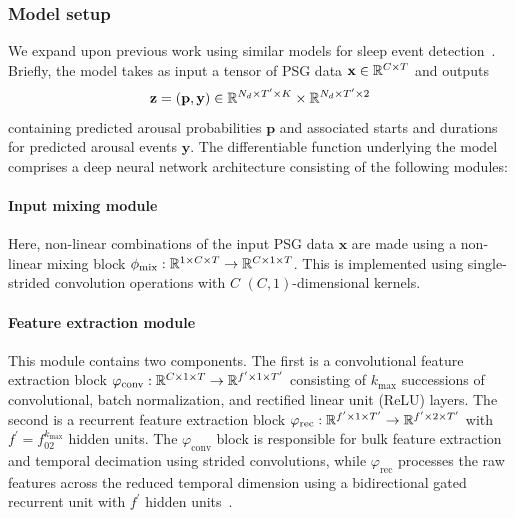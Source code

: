\subsubsection{Model setup}
We expand upon previous work using similar models for sleep event detection~\cite{Chambon2018b, Chambon2019, Olesen2019}. 
Briefly, the model takes as input a tensor of \ac{PSG} data $\mathbf{x} \in \mathbb{R}^{C \times T}$ and outputs 
\begin{equation}
    \mathbf{z} = \left( \mathbf{p}, \mathbf{y} \right) \in \real{N_d \times T^{\prime} \times K} \times \real{N_d \times T^{\prime} \times 2}
\end{equation}
containing predicted arousal probabilities $\mathbf{p}$ and associated starts and durations for predicted arousal events $\mathbf{y}$.
The differentiable function underlying the model comprises a deep neural network architecture consisting of the following modules:
\paragraph{Input mixing module}
Here, non-linear combinations of the input \ac{PSG} data $\mathbf{x}$ are made using a non-linear mixing block $\phi_{\mathrm{mix}} : \mathbb{R}^{1 \times C \times T} \to \mathbb{R}^{C \times 1 \times T}$.
This is implemented using single-strided \twod convolution operations with $C$ \( \left( C, \num{1} \right) \)-dimensional kernels.
\paragraph{Feature extraction module}
This module contains two components. 
The first is a convolutional feature extraction block $\varphi_{\mathrm{conv}} : \mathbb{R}^{C \times 1 \times T} \to \mathbb{R}^{f^{\prime} \times 1 \times T^{\prime}}$ consisting of $k_{\mathrm{max}}$ successions of convolutional, batch normalization, and rectified linear unit (ReLU) layers.
The second is a recurrent feature extraction block $\varphi_{\mathrm{rec}} : \mathbb{R}^{f^{\prime} \times 1 \times T^{\prime}} \to \mathbb{R}^{f^{\prime} \times 2 \times T^{\prime}}$ with $f^{\prime}=f_02^{k_{\mathrm{max}}}$ hidden units.
The $\varphi_{\mathrm{conv}}$ block is responsible for bulk feature extraction and temporal decimation using strided convolutions, while $\varphi_{\mathrm{rec}}$ processes the raw features across the reduced temporal dimension using a bidirectional gated recurrent unit with $f^{\prime}$ hidden units~\cite{Cho2014}.
